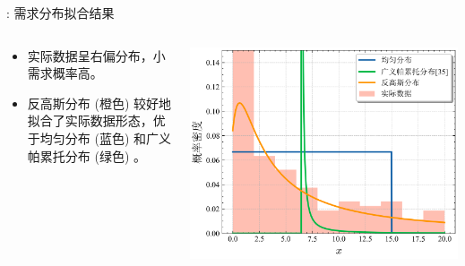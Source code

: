 \documentclass[9pt]{beamer}
\begin{document}
\begin{frame}{\insertsectionhead: 需求分布拟合结果}
    \begin{columns}
        \begin{column}{0.5\textwidth}
            \begin{itemize}
                \item 实际数据呈右偏分布，小需求概率高。
                \item 反高斯分布 (橙色) 较好地拟合了实际数据形态，优于均匀分布 (蓝色) 和广义帕累托分布 (绿色) \cite{Li2022Stackelberg}。
            \end{itemize}
        \end{column}
        
        \begin{column}{0.5\textwidth}
            \centering
            \includegraphics[width=\linewidth]{basic_pictures/分布拟合.png}
            \label{fig:beamer_dist_fit}
        \end{column}
    \end{columns}
\end{frame}

\end{document}
